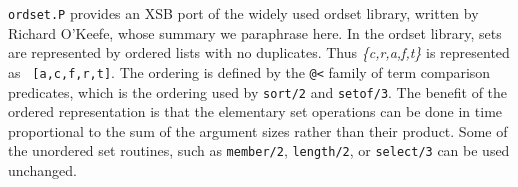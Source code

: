 {\tt ordset.P} provides an XSB port of the widely used ordset library,
written by Richard O'Keefe, whose summary we paraphrase here.  In the
ordset library, sets are represented by ordered lists with no
duplicates.  Thus {\em \{c,r,a,f,t\}} is represented as {\tt
[a,c,f,r,t]}.  The ordering is defined by the \verb|@<| family of term
comparison predicates, which is the ordering used by {\tt sort/2} and
{\tt setof/3}.  The benefit of the ordered representation is that the
elementary set operations can be done in time proportional to the sum
of the argument sizes rather than their product.  Some of the
unordered set routines, such as {\tt member/2}, {\tt length/2}, or
{\tt select/3} can be used unchanged.


